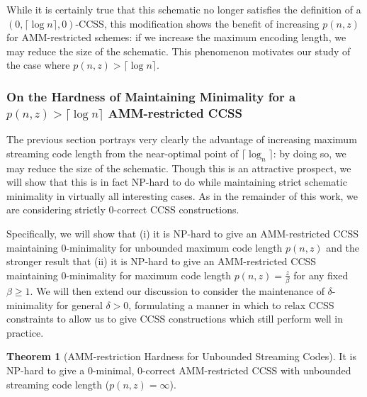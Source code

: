 \documentclass{article}
\theoremstyle{definition}
\newtheorem{theorem}{Theorem}[section]
\begin{document}
\noindent While it is certainly true that this schematic no longer satisfies 
the definition of a $(0, \lceil \log{n} \rceil, 0)$-CCSS, this modification shows 
the benefit of increasing $p(n,z)$ for AMM-restricted schemes: if we increase the 
maximum encoding length, we may reduce the size of the schematic.  This phenomenon 
motivates our study of the case where $p(n,z) > \lceil \log{n} \rceil$.

\subsubsection{On the Hardness of Maintaining Minimality for a $p(n,z)>\lceil \log{n} \rceil$ AMM-restricted CCSS}

The previous section portrays very clearly the advantage of increasing maximum 
streaming code length from the near-optimal point of $\lceil \log_{n} \rceil$: 
by doing so, we may reduce the size of the schematic.  Though this is an attractive
prospect, we will show that this is in fact NP-hard to do while maintaining strict
schematic minimality in virtually all interesting cases.  As in the remainder of 
this work, we are considering strictly 0-correct CCSS constructions.

Specifically, we will 
show that (i) it is NP-hard to give an AMM-restricted CCSS maintaining 0-minimality for 
unbounded maximum code length $p(n,z)$ and the stronger result that (ii) 
it is NP-hard to give an AMM-restricted CCSS maintaining 0-minimality for maximum code length
$p(n,z)=\frac{z}{\beta}$ for any fixed $\beta \geq 1$.  We will then extend 
our discussion to consider the maintenance of $\delta$-minimality for general 
$\delta > 0$, formulating a manner in which to relax CCSS constraints 
to allow us to give CCSS constructions which still perform well in practice.

\begin{theorem}[AMM-restriction Hardness for Unbounded Streaming Codes]
\label{UnboundedHardness}
It is NP-hard to give a 0-minimal, 0-correct AMM-restricted CCSS with unbounded 
streaming code length ($p(n,z)=\infty$).
\end{theorem}
\end{document}
